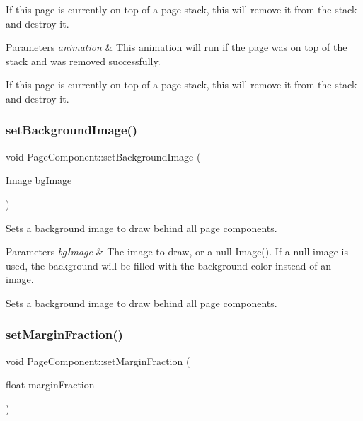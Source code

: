 If this page is currently on top of a page stack, this will remove it from the stack and destroy it.


\begin{DoxyParams}{Parameters}
{\em animation} & This animation will run if the page was on top of the stack and was removed successfully.\\
\hline
\end{DoxyParams}
If this page is currently on top of a page stack, this will remove it from the stack and destroy it. \mbox{\label{classPageComponent_a8928cfec4b20fdb541ec1cf20cf0c194}} 
\subsubsection{\texorpdfstring{set\+Background\+Image()}{setBackgroundImage()}}
{\footnotesize\ttfamily void Page\+Component\+::set\+Background\+Image (\begin{DoxyParamCaption}\item[{Image}]{bg\+Image }\end{DoxyParamCaption})}

Sets a background image to draw behind all page components.


\begin{DoxyParams}{Parameters}
{\em bg\+Image} & The image to draw, or a null Image(). If a null image is used, the background will be filled with the background color instead of an image.\\
\hline
\end{DoxyParams}
Sets a background image to draw behind all page components. \mbox{\label{classPageComponent_a7dd0b15f5369377d281fc66509979090}} 
\subsubsection{\texorpdfstring{set\+Margin\+Fraction()}{setMarginFraction()}}
{\footnotesize\ttfamily void Page\+Component\+::set\+Margin\+Fraction (\begin{DoxyParamCaption}\item[{float}]{margin\+Fraction }\end{DoxyParamCaption})\hspace{0.3cm}{\ttfamily [protected]}}


